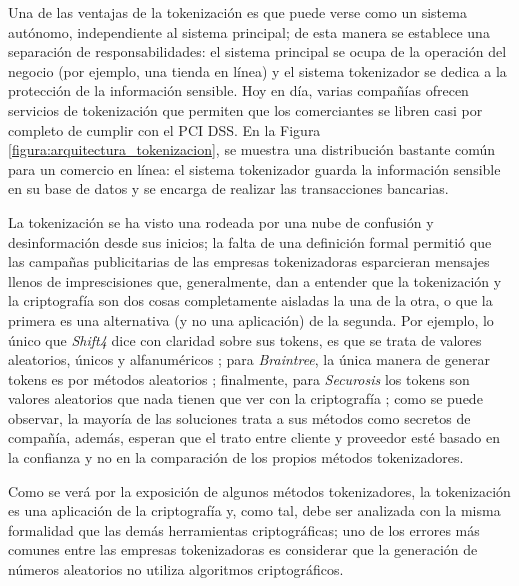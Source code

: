 Una de las ventajas de la tokenización es que puede verse como un sistema
autónomo, independiente al sistema principal; de esta manera se establece una
separación de responsabilidades: el sistema principal se ocupa de la operación
del negocio (por ejemplo, una tienda en línea) y el sistema tokenizador se
dedica a la protección de la información sensible. Hoy en día, varias compañías
ofrecen servicios de tokenización que permiten que los comerciantes se libren
casi por completo de cumplir con el PCI DSS. En la Figura
\ref{figura:arquitectura_tokenizacion}, se muestra una distribución bastante
común para un comercio en línea: el sistema tokenizador guarda la información
sensible en su base de datos y se encarga de realizar las transacciones
bancarias.

La tokenización se ha visto una rodeada por una nube de confusión y 
desinformación desde sus inicios; la falta de una definición formal permitió
que las campañas publicitarias de las empresas tokenizadoras esparcieran 
mensajes llenos de imprescisiones que, generalmente, dan a entender que la
tokenización y la criptografía son dos cosas completamente aisladas la una de la
otra, o que la primera es una alternativa (y no una aplicación) de la segunda.
Por ejemplo, lo único que \textit{Shift4} dice con claridad sobre sus tokens,
es que se trata de valores aleatorios, únicos y alfanuméricos \cite{shif4_uno}; 
para \textit{Braintree}, la única manera de generar tokens es por métodos
aleatorios \cite{braintree_uno}; finalmente, para \textit{Securosis} los tokens
son valores aleatorios que nada tienen que ver con la criptografía
\cite{securosis}; como se puede observar, la mayoría de las soluciones trata a
sus métodos como secretos de compañía, además, esperan que el trato entre
cliente y proveedor esté basado en la confianza y no en la comparación de los
propios métodos tokenizadores.


Como se verá por la exposición de algunos métodos tokenizadores, la tokenización
es una aplicación de la criptografía y, como tal, debe ser analizada con la
misma formalidad que las demás herramientas criptográficas; uno de los errores
más comunes entre las empresas tokenizadoras es considerar que la generación de
números aleatorios no utiliza algoritmos criptográficos.



